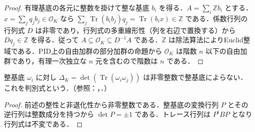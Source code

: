 \begin{proof}
有理基底の各元に整数を掛けて整な基底 $b_i$ を得る．$A=\sum_i\mathbb Z b_i$ とする．$x=\sum_j q_j b_j\in\mathcal O_K$ なら $\sum_j\operatorname{Tr}(b_i b_j)q_j=\operatorname{Tr}(b_ix)\in\mathbb Z$ である．係数行列の行列式 $D$ は非零であり，行列式の多重線形性（列を右辺で置換する）から $Dq_j\in\mathbb Z$ を得る．従って $A\subseteq\mathcal O_K\subseteq D^{-1}A$ である．$\mathbb Z$ は除法算法によりEuclid整域である．PID上の自由加群の部分加群の命題から $\mathcal O_K$ は階数 $n$ 以下の自由加群であり，有理一次独立な $n$ 元を含むので階数は $n$ である．
\end{proof}
\begin{prop}[数体の判別式]
整基底 $\omega_i$ に対し $\Delta_K=\det(\operatorname{Tr}(\omega_i\omega_j))$ は非零整数で整基底によらない．これを判別式という．（参照：，．）
\end{prop}
\begin{proof}
前述の整性と非退化性から非零整数である．整基底の変換行列 $P$ とその逆行列は整数成分を持つから $\det P=\pm1$ である．トレース行列は $P^{\mathrm t}BP$ となり行列式は不変である．
\end{proof}

